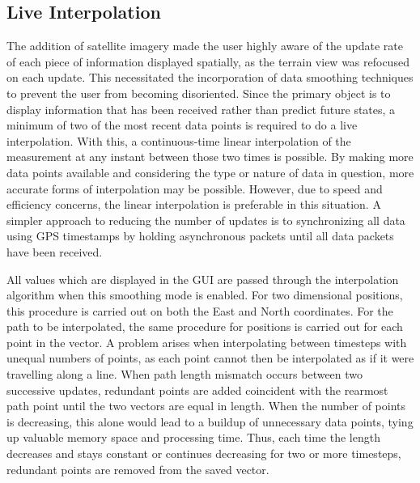 \documentclass[twocolumn,10pt]{article}
\begin{document}
  \subsection*{Live Interpolation}

    The addition of satellite imagery made the user highly aware of the update rate of each piece of information displayed spatially, as the terrain view was refocused on each update.  This necessitated the incorporation of data smoothing techniques to prevent the user from becoming disoriented.
    Since the primary object is to display information that has been received rather than predict future states, a minimum of two of the most recent data points is required to do a live interpolation.  With this, a continuous-time linear interpolation of the measurement at any instant between those two times is possible.  By making more data points available and considering the type or nature of data in question, more accurate forms of interpolation may be possible. However, due to speed and efficiency concerns, the linear interpolation is preferable in this situation.
    A simpler approach to reducing the number of updates is to synchronizing all data using GPS timestamps by holding asynchronous packets until all data packets have been received.
    
    All values which are displayed in the GUI are passed through the interpolation algorithm when this smoothing mode is enabled.
    For two dimensional positions, this procedure is carried out on both the East and North coordinates. 
    For the path to be interpolated,  the same procedure for positions is carried out for each point in the vector. A problem arises when interpolating between timesteps with unequal numbers of points, as each point cannot then be interpolated as if it were travelling along a line. When path length mismatch occurs between two successive updates, redundant points are added coincident with the rearmost path point until the two vectors are equal in length. When the number of points is decreasing, this alone would lead to a buildup of unnecessary data points, tying up valuable memory space and processing time. Thus, each time the length decreases and stays constant or continues decreasing for two or more timesteps, redundant points are removed from the saved vector.
\end{document}
